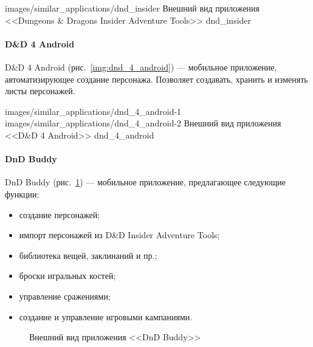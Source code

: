            {images/similar_applications/dnd_insider}
            {Внешний вид приложения <<Dungeons \& Dragons Insider Adventure Tools>>}
            {dnd_insider}



\paragraph{D\&D 4 Android}
D\&D 4 Android (рис.~\ref{img:dnd_4_android}) --- мобильное приложение, автоматизирующее создание персонажа. Позволяет создавать, хранить и изменять листы персонажей.

               {images/similar_applications/dnd_4_android-1}
               {images/similar_applications/dnd_4_android-2}
               {Внешний вид приложения <<D\&D 4 Android>>}
               {dnd_4_android}


\paragraph{DnD Buddy}
DnD Buddy (рис.~\ref{img:dnd_buddy}) --- мобильное приложение, предлагающее следующие функции:
\begin{itemize}
\item создание персонажей;
\item импорт персонажей из D\&D Insider Adventure Tools;
\item библиотека вещей, заклинаний и пр.;
\item броски игральных костей;
\item управление сражениями;
\item создание и управление игровыми кампаниями.
\end{itemize}

\begin{figure}[!h]
\caption{Внешний вид приложения <<DnD Buddy>>}
\label{img:dnd_buddy}
\end{figure}


